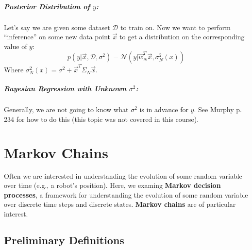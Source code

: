 \documentclass[a4paper,12pt]{report}
\begin{document}
\paragraph{Posterior Distribution of $y$: } Let's say we are given some dataset $\mathcal D$ to train on. Now we want to perform ``inference'' on some new data point $\vec x$ to get a distribution on the corresponding value of $y$: 
\begin{equation}
p(y | \vec x, \mathcal D, \sigma^2) = \mathcal N(y | \vec w_N^T \vec x, \sigma^2_N(x))
\end{equation}
Where $\sigma_N^2(x) = \sigma^2 + \vec x^T\Sigma_N\vec x$.


\paragraph{Bayesian Regression with Unknown $\sigma^2$: } Generally, we are not going to know what $\sigma^2$ is in advance for $y$. See Murphy p. 234 for how to do this (this topic was not covered in this course).






\chapter{Markov Chains}

Often we are interested in understanding the evolution of some random variable over time (e.g., a robot's position). Here, we examing \textbf{Markov decision processes}, a framework for understanding the evolution of some random variable over discrete time steps and discrete states. \textbf{Markov chains} are of particular interest.

\section{Preliminary Definitions}
\end{document}

